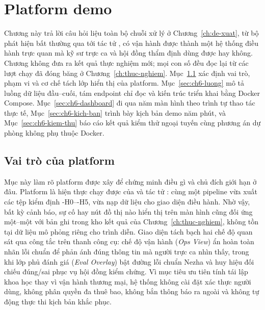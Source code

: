 
\section{Platform demo}
\label{ch:platform}

Chương này trả lời câu hỏi liệu toàn bộ chuỗi xử lý ở Chương~\ref{ch:de-xuat}, từ bộ phát hiện bất thường qua \CTAV{} tới tác tử , có vận hành được thành một hệ thống điều hành trực quan mà kỹ sư trực ca và hội đồng thẩm định dùng được hay không. Chương không đưa ra kết quả thực nghiệm mới; mọi con số đều đọc lại từ các lượt chạy đã đóng băng ở Chương~\ref{ch:thuc-nghiem}. Mục~\ref{sec:ch6-vai-tro} xác định vai trò, phạm vi và cơ chế tách lớp hiển thị của platform. Mục~\ref{sec:ch6-luong} mô tả luồng dữ liệu đầu--cuối, tám endpoint chỉ đọc và kiến trúc triển khai bằng Docker Compose. Mục~\ref{sec:ch6-dashboard} đi qua năm màn hình theo trình tự thao tác thực tế, Mục~\ref{sec:ch6-kich-ban} trình bày kịch bản demo năm phút, và Mục~\ref{sec:ch6-kiem-thu} báo cáo kết quả kiểm thử ngoại tuyến cùng phương án dự phòng không phụ thuộc Docker.

\subsection{Vai trò của platform}
\label{sec:ch6-vai-tro}

Mục này làm rõ platform được xây để chứng minh điều gì và chủ đích giới hạn ở đâu. Platform là hiện thực chạy được của \CTAV{} và tác tử : cùng một pipeline vừa xuất các tệp kiểm định \hyp{H0}--\hyp{H5}, vừa nạp dữ liệu cho giao diện điều hành. Nhờ vậy, bất kỳ cảnh báo, sự cố hay nút đồ thị nào hiển thị trên màn hình cũng đối ứng một--một với bản ghi trong kho kết quả của Chương~\ref{ch:thuc-nghiem}, không tồn tại dữ liệu mô phỏng riêng cho trình diễn. Giao diện tách bạch hai chế độ quan sát qua công tắc trên thanh công cụ: chế độ vận hành (\emph{Ops View}) ẩn hoàn toàn nhãn lỗi chuẩn để phản ánh đúng thông tin mà người trực ca nhìn thấy, trong khi lớp phủ đánh giá (\emph{Eval Overlay}) bật đường lỗi chuẩn Nezha và huy hiệu đối chiếu đúng/sai phục vụ hội đồng kiểm chứng. Vì mục tiêu ưu tiên tính tái lập khoa học thay vì vận hành thương mại, hệ thống không cài đặt xác thực người dùng, không phân quyền đa thuê bao, không bắn thông báo ra ngoài và không tự động thực thi kịch bản khắc phục.

